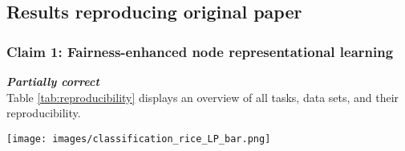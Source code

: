 \subsection{Results reproducing original paper}
\subsubsection{Claim 1: Fairness-enhanced node representational learning
}
\textit{\textbf{Partially correct}}\\
Table \ref{tab:reproducibility} displays an overview of all tasks, data sets, and their reproducibility. 


\begin{table}[!htb]
\centering
\begin{minipage}{0.4\textwidth}
    \centering
    \caption{Overview of the performed experimentation. \greencheck - that similar values were obtained, while \redcross - the values obtained did not match the paper.}
    \label{tab:reproducibility}
\end{minipage}
\qquad
\begin{minipage}[c]{0.4\textwidth}
    \centering
    \texttt{[image: images/classification\_rice\_LP\_bar.png]}
    \label{fig:node-classification}
\end{minipage}
\end{table}

